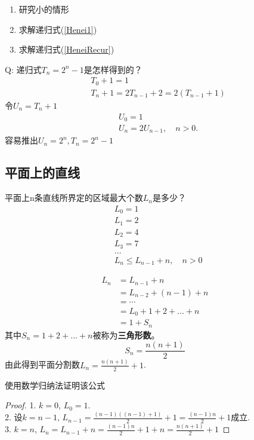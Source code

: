 \documentclass[mode=geye]{elegantnote}
\begin{document}
\begin{remark}
	\begin{enumerate}
		\item  研究小的情形
		\item  求解递归式(\ref{Henei1})
		\item  求解递归式(\ref{HeneiRecur})
	\end{enumerate}
\end{remark}

Q: 递归式$ T_n= 2^n -1 $是怎样得到的？
\begin{align*}
	&T_0 + 1 = 1\\
	&T_n+1 = 2T_{n-1}+2 = 2(T_{n-1}+1)
\end{align*}
令$ U_n = T_n+1 $
\begin{align*}
	&U_0 = 1\\
	&U_n = 2U_{n-1}, \quad n>0.
\end{align*}
容易推出$ U_n  = 2^n, T_n = 2^n-1 $

\subsection{平面上的直线}
平面上n条直线所界定的区域最大个数$ L_n $是多少？
\begin{align*}
	&L_0 = 1\\
	&L_1 = 2\\
	&L_2 = 4\\
	&L_3 = 7\\
	&\ldots\\
	&L_n \leqslant L_{n-1}+n, \quad n>0	
\end{align*}

\begin{align*}
	L_n &= L_{n-1} + n\\
	& = L_{n-2}+(n-1)+n\\
	&=\cdots\\
	&=L_0+1+2+\dots+n\\
	&=1+S_n
\end{align*}
其中$ S_n = 1+2+\dots+n $被称为\textbf{三角形数}。
\begin{equation}\label{sanjiaoxingshu}
	S_n = \frac{n(n+1)}{2}
\end{equation}
由此得到平面分割数$ L_n = \frac{n(n+1)}{2}+1 $.

使用数学归纳法证明该公式
\begin{proof}
	1. $ k=0 $, $ L_0 = 1 $.\\
	2. 设$ k=n-1 $, $ L_{n-1} = \frac{(n-1)((n-1)+1)}{2}+1=\frac{(n-1)n}{2}+1 $成立.\\
	3. $ k=n $, $ L_n = L_{n-1}+n = \frac{(n-1)n}{2}+1+n = \frac{n(n+1)}{2}+1 $
\end{proof}
\end{document}
